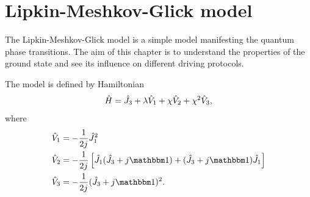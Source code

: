 \chapter{Lipkin-Meshkov-Glick model}
\label{chap:lipkin}

The Lipkin-Meshkov-Glick model is a simple model manifesting the quantum phase transitions. The aim of this chapter is to understand the properties of the ground state and see its influence on different driving protocols.


The model is defined by Hamiltonian
\begin{equation}
    \hat{H}=\hat{J}_3+\lambda\hat V_1 +\chi \hat V_2+\chi^2 \hat V_3,
    \label{eq:firstOrderTransitionHamiltonian}
\end{equation}
where
\begin{align}
    \hat V_1 &=-\frac{1}{2j}\J_1^2\\
    \hat V_2 &= -\frac{1}{2j}\left[\J_1(\J_3+j\Id)+(\J_3+j\Id)\J_1\right]\\
    \hat V_3 &= -\frac{1}{2j}(\J_3+j\Id)^2.
\end{align}



